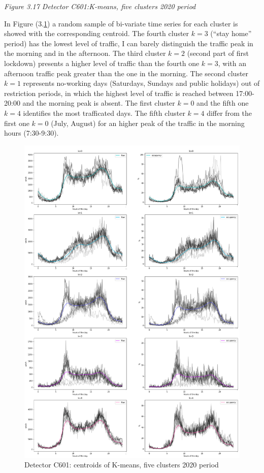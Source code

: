 \documentclass[11pt]{article}
\begin{document}
\emph{\small Figure 3.17 Detector C601:K-means, five clusters 2020 period}

    In Figure (3.\ref{fig:3.18}) a random sample of bi-variate time series
for each cluster is showed with the corresponding centroid. The fourth
cluster \(k=3\) (``stay home'' period) has the lowest level of traffic,
I can barely distinguish the traffic peak in the morning and in the
afternoon. The third cluster \(k=2\) (second part of first lockdown)
presents a higher level of traffic than the fourth one \(k=3\), with an
afternoon traffic peak greater than the one in the morning. The second
cluster \(k=1\) represents no-working days (Saturdays, Sundays and
public holidays) out of restriction periods, in which the highest level
of traffic is reached between 17:00-20:00 and the morning peak is
absent. The first cluster \(k=0\) and the fifth one \(k=4\) identifies
the most trafficated days. The fifth cluster \(k=4\) differ from the
first one \(k=0\) (July, August) for an higher peak of the traffic in
the morning hours (7:30-9:30).

    \begin{figure}
    \centering
    \includegraphics{softDTW centroids K=5 2020.png}
    \caption{Detector C601: centroids of K-means, five clusters 2020 period}
    \label{fig:3.18}
\end{figure}
\end{document}

